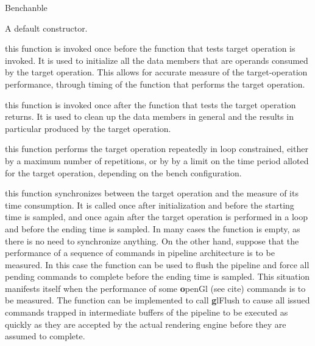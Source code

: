 \begin{ccRefConcept}{Benchanble}


  \ccCreation
  {A default constructor.}

  \ccOperations

  {this function is invoked once before the function that tests target
    operation is invoked. It is used to initialize all the data members that
    are operands consumed by the target operation. This allows for accurate
    measure of the target-operation performance, through timing of the function
    that performs the target operation.}
  
  {this function is invoked once after the function that tests the target
    operation returns. It is used to clean up the data members in general and
    the results in particular produced by the target operation.}
  
  {this function performs the target operation
    repeatedly in loop constrained, either by a maximum number of repetitions,
    or by by a limit on the time period alloted for the target operation,
    depending on the bench configuration.}

  {this function synchronizes between the target operation and the measure of
    its time consumption. It is called once after initialization and before the
    starting time is sampled, and once again after the target operation is
    performed in a loop and before the ending time is sampled. In many cases
    the  function is empty, as there is no need to synchronize
    anything. On the other hand, suppose that the performance of a sequence of
    commands in pipeline architecture is to be measured. In this case the
     function can be used to flush the pipeline and force all pending
    commands to complete before the ending time is sampled. This situation
    manifests itself when the performance of some {\textbf openGl} (see cite)
    commands is to be measured. The  function can be implemented to
    call {\textbf glFlush} to cause all issued commands trapped in intermediate
    buffers of the pipeline to be executed as quickly as they are accepted by
    the actual rendering engine before they are assumed to complete.}

\end{ccRefConcept}

